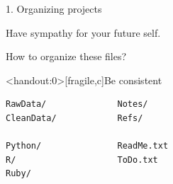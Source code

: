 \documentclass[aspectratio=169,12pt,t]{beamer}
\begin{document}
\begin{frame}[c]{1. Organizing projects}

\begin{center}
\large
Have sympathy for your future self.
\end{center}


\end{frame}




\begin{frame}[c]{How to organize these files?}

\vspace{5mm}


\end{frame}




\begin{frame}<handout:0>[fragile,c]{Be consistent}


\begin{center}
\begin{minipage}[c]{10.3cm}
\begin{semiverbatim}
\lstset{basicstyle=\normalsize}
\begin{lstlisting}[linewidth=10.3cm]
RawData/              Notes/
CleanData/            Refs/

Python/               ReadMe.txt
R/                    ToDo.txt
Ruby/
\end{lstlisting}
\end{semiverbatim}
\end{minipage}
\end{center}

\end{frame}
\end{document}
